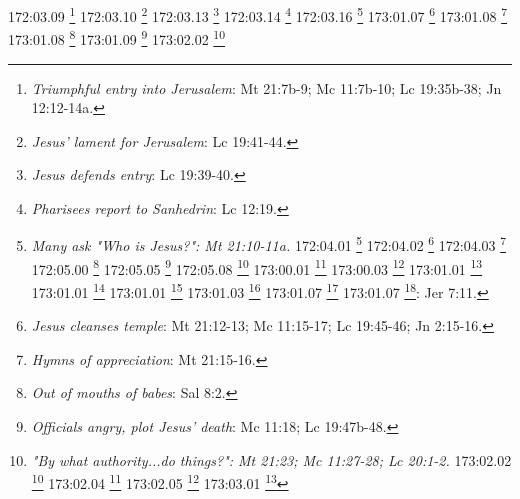 {{{{{{{{{{{{{{{{{{{{{{{{{{{{{{{{{{{{{{{{{{{{{{{{{{{{{{{172:03.09 \footnote{\textit{Triumphful entry into Jerusalem}: Mt 21:7b-9; Mc 11:7b-10; Lc 19:35b-38; Jn 12:12-14a.}
172:03.10 \footnote{\textit{Jesus' lament for Jerusalem}: Lc 19:41-44.}
172:03.13 \footnote{\textit{Jesus defends entry}: Lc 19:39-40.}
172:03.14 \footnote{\textit{Pharisees report to Sanhedrin}: Lc 12:19.}
172:03.16 \footnote{\textit{Many ask "Who is Jesus?": Mt 21:10-11a.}
172:04.01 \footnote{\textit{Jesus visits temple}: Mc 11:11a.}
172:04.02 \footnote{\textit{The widow's mite}: Mc 12:41-44; Lc 21:1-4.}
172:04.03 \footnote{\textit{To Bethany}: Mc 11:11b.}
172:05.00 \footnote{\textit{The Apostles' attitude}: Jn 12:16a.}
172:05.05 \footnote{\textit{Zechariah's prophecy}: Zac 9:9.}
172:05.08 \footnote{\textit{Zechariah's prophecy fulfilled}: Zac 9:9.}
173:00.01 \footnote{\textit{Jesus goes to Jerusalem}: Mc 11:12a; Jn 2:13.}
173:00.03 \footnote{\textit{Arrival at temple}: Mt 21:12a; Mc 11:15a; Lc 19:45a.}
173:01.01 \footnote{\textit{Commerce in Temple courts}: Jn 2:14a.}
173:01.01 \footnote{\textit{Sacrifice animals "without blemish"}: Lv 22:18-25.}
173:01.01 \footnote{\textit{Sale of unblemished animals}: Mt 21:12a; Mc 11:15a; Lc 19:45b; Jn 2:14a.}
173:01.03 \footnote{\textit{Money changers}: Mt 21:12b; Mc 11:15b; Lc 19:45b; Jn 2:14.}
173:01.07 \footnote{\textit{Father's a house of prayer}: Is 56:7.}
173:01.07 \footnote{\textit{Father's house}: den of thieves}: Jer 7:11.}
173:01.07 \footnote{\textit{Jesus cleanses temple}: Mt 21:12-13; Mc 11:15-17; Lc 19:45-46; Jn 2:15-16.}
173:01.08 \footnote{\textit{Hymns of appreciation}: Mt 21:15-16.}
173:01.08 \footnote{\textit{Out of mouths of babes}: Sal 8:2.}
173:01.09 \footnote{\textit{Officials angry, plot Jesus' death}: Mc 11:18; Lc 19:47b-48.}
173:02.02 \footnote{\textit{"By what authority...do things?": Mt 21:23; Mc 11:27-28; Lc 20:1-2.}
173:02.02 \footnote{\textit{Show us a sign}: Jn 2:18.}
173:02.04 \footnote{\textit{Jesus asks questions}: Mt 21:24-25a; Mc 11:29-30; Lc 20:3-4.}
173:02.05 \footnote{\textit{Gets no answers}: Mt 21:25b-27; Mc 11:31-33; Lc 20:5-8.}
173:03.01 \footnote{\textit{Parable of two sons (part 1): Mt 21:28-31a.}
173:03.02 \footnote{\textit{Parable of two sons (part 2): Mt 21:31b-32.}
173:04.02 \footnote{\textit{Parable of absent landlord (part 1): Mt 21:33-40; Mc 12:1-9a; Lc 20:9-16a.}
173:04.03 \footnote{\textit{Parable of absent landlord (part 2): Mt 21:41; Mc 12:9b.}
173:04.03 \footnote{\textit{Parable of absent landlord (part 3): Lc 20:16b.}
173:04.04 \footnote{\textit{Becomes cornerstone}: Sal 118:22.}
173:04.04 \footnote{\textit{Parable of rejected stone}: Mt 21:42-44; Mc 12:10; Lc 20:17-18.}
}}}}}}}}}}}}}}}}}}}}}}}}}}}}}}}}}}}}}}}}}}}}}}}}}}}}}}}}}}}}}
